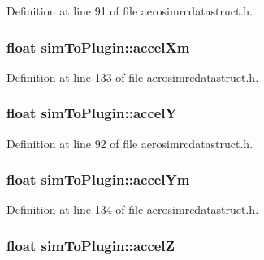 \-Definition at line 91 of file aerosimrcdatastruct.\-h.

\hypertarget{group___aero_sim_r_c_ga8e87f9c4846725309216b66cf48a4fdd}{
\subsubsection[{accel\-Xm}]{\setlength{\rightskip}{0pt plus 5cm}float {\bf sim\-To\-Plugin\-::accel\-Xm}}}\label{group___aero_sim_r_c_ga8e87f9c4846725309216b66cf48a4fdd}


\-Definition at line 133 of file aerosimrcdatastruct.\-h.

\hypertarget{group___aero_sim_r_c_gacbcac5da9b87bf7eb091f7a83b3d2fda}{
\subsubsection[{accel\-Y}]{\setlength{\rightskip}{0pt plus 5cm}float {\bf sim\-To\-Plugin\-::accel\-Y}}}\label{group___aero_sim_r_c_gacbcac5da9b87bf7eb091f7a83b3d2fda}


\-Definition at line 92 of file aerosimrcdatastruct.\-h.

\hypertarget{group___aero_sim_r_c_gafb442cc82353fedd9b1a4b1f841a780a}{
\subsubsection[{accel\-Ym}]{\setlength{\rightskip}{0pt plus 5cm}float {\bf sim\-To\-Plugin\-::accel\-Ym}}}\label{group___aero_sim_r_c_gafb442cc82353fedd9b1a4b1f841a780a}


\-Definition at line 134 of file aerosimrcdatastruct.\-h.

\hypertarget{group___aero_sim_r_c_ga757616fff3384f894b594e9681d39f90}{
\subsubsection[{accel\-Z}]{\setlength{\rightskip}{0pt plus 5cm}float {\bf sim\-To\-Plugin\-::accel\-Z}}}\label{group___aero_sim_r_c_ga757616fff3384f894b594e9681d39f90}


